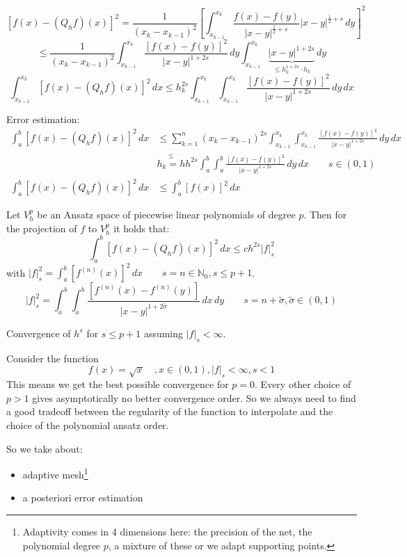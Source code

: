\documentclass{article}
\begin{document}
\[ \left[f(x) - (Q_h f)(x)\right]^2 = \frac{1}{(x_k - x_{k-1})^2} \left[\int_{x_{k-1}}^{x_k} \frac{f(x) - f(y)}{|x - y|^{\frac12 + s}} |x - y|^{\frac12 + s} \, dy \right]^2 \]
\[ \leq \frac{1}{(x_k - x_{k-1})^2} \int_{x_{k-1}}^{x_k} \frac{[f(x) - f(y)]^2}{|x-y|^{1 + 2s}} \, dy \int_{x_{k-1}}^{x_k} \underbrace{|x-y|^{1+2s}}_{\leq h_k^{1 + 2s} \cdot h_k} \,dy \]
\[ \int_{x_{k-1}}^{x_k} \left[f(x) - (Q_h f)(x)\right]^2 \, dx \leq h_k^{2s} \int_{x_{k-1}}^{x_{k}} \int_{x_{k-1}}^{x_k} \frac{[f(x) - f(y)]^2}{|x - y|^{1 + 2s}} \, dy \, dx \]

Error estimation:
\begin{align*}
  \int_a^b [f(x) - (Q_h f)(x)]^2 \, dx
    &\leq \sum_{k=1}^n (x_k - x_{k-1})^{2s} \int_{x_{k-1}}^{x_k} \int_{x_{k-1}}^{x_k} \frac{[f(x) - f(y)]^2}{|x - y|^{1 + 2s}} \, dy \, dx \\
    &\stackrel{\leq}{h_k = h} h^{2s} \int_a^b \int_a^b \frac{[f(x) - f(y)]^2}{|x - y|^{1 + 2s}} \, dy \, dx \qquad s \in (0,1) \\
  \int_a^b [f(x) - (Q_h f)(x)]^2 \, dx &\leq \int_a^b [f(x)]^2 \, dx
\end{align*}

Let $V_h^p$ be an Ansatz space of piecewise linear polynomials of degree $p$.
Then for the projection of $f$ to $V_h^p$ it holds that:
\[ \int_a^b [f(x) - (Q_h f)(x)]^2 \, dx \leq c h^{2s} |f|_s^2 \]
with $|f|_s^2 = \int_a^b [f^{(n)}(x)]^2 \, dx \qquad s = n \in \mathbb N_0, s \leq p + 1$.
\[ |f|_s^2 = \int_a^b \int_a^b \frac{[f^{(n)}(x) - f^{(n)}(y)]}{|x - y|^{1 + 2\tilde{\sigma}}} \, dx \, dy \qquad s = n + \tilde{\sigma}, \tilde{\sigma} \in (0,1) \]

Convergence of $h^s$ for $s \leq p + 1$ assuming $|f|_s < \infty$.

Consider the function
\[ f(x) = \sqrt x \quad , x \in (0,1), |f|_s < \infty, s < 1 \]
This means we get the best possible convergence for $p=0$.
Every other choice of $p > 1$ gives asymptotically no better convergence order.
So we always need to find a good tradeoff between the regularity of the function to interpolate and the choice of the polynomial ansatz order. %

So we take about:
\begin{itemize}
  \item adaptive mesh\footnote{Adaptivity comes in 4 dimensions here: the precision of the net, the polynomial degree $p$, a mixture of these or we adapt supporting points.}
  \item a posteriori error estimation
\end{itemize}
\end{document}
